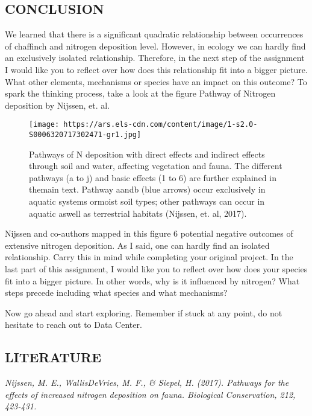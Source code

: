 \documentclass[
]{article}
\begin{document}
\hypertarget{conclusion}{%
\subsection{CONCLUSION}\label{conclusion}}

We learned that there is a significant quadratic relationship between
occurrences of chaffinch and nitrogen deposition level. However, in
ecology we can hardly find an exclusively isolated relationship.
Therefore, in the next step of the assignment I would like you to
reflect over how does this relationship fit into a bigger picture. What
other elements, mechanisms or species have an impact on this outcome? To
spark the thinking process, take a look at the figure Pathway of
Nitrogen deposition by Nijssen, et. al.~

\begin{figure}
\centering
\texttt{[image: https://ars.els-cdn.com/content/image/1-s2.0-S0006320717302471-gr1.jpg]}
\caption{Pathways of N deposition with direct effects and indirect
effects through soil and water, affecting vegetation and fauna. The
different pathways (a to j) and basic effects (1 to 6) are further
explained in themain text. Pathway aandb (blue arrows) occur exclusively
in aquatic systems ormoist soil types; other pathways can occur in
aquatic aswell as terrestrial habitats (Nijssen, et. al, 2017).}
\end{figure}

Nijssen and co-authors mapped in this figure 6 potential negative
outcomes of extensive nitrogen deposition. As I said, one can hardly
find an isolated relationship. Carry this in mind while completing your
original project. In the last part of this assignment, I would like you
to reflect over how does your species fit into a bigger picture. In
other words, why is it influenced by nitrogen? What steps precede
including what species and what mechanisms?

Now go ahead and start exploring. Remember if stuck at any point, do not
hesitate to reach out to Data Center.

\hypertarget{literature-1}{%
\subsection{LITERATURE}\label{literature-1}}

\emph{Nijssen, M. E., WallisDeVries, M. F., \& Siepel, H. (2017).
Pathways for the effects of increased nitrogen deposition on fauna.
Biological Conservation, 212, 423-431.}
\end{document}
